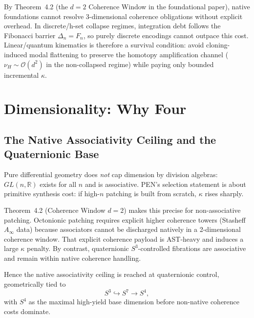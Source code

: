 \documentclass[12pt,a4paper]{article}
\theoremstyle{definition}
\newcommand{\R}{\mathbb{R}}
\begin{document}
By Theorem~4.2 (the $d=2$ Coherence Window in the foundational paper), native foundations cannot resolve 3-dimensional coherence obligations without explicit overhead. In discrete/h-set collapse regimes, integration debt follows the Fibonacci barrier $\Delta_n=F_n$, so purely discrete encodings cannot outpace this cost. Linear/quantum kinematics is therefore a survival condition: avoid cloning-induced modal flattening to preserve the homotopy amplification channel ($\nu_H\sim\mathcal{O}(d^2)$ in the non-collapsed regime) while paying only bounded incremental $\kappa$.

\begin{center}
\end{center}

\section{Dimensionality: Why Four}

\subsection{The Native Associativity Ceiling and the Quaternionic Base}

Pure differential geometry does \emph{not} cap dimension by division algebras: $GL(n,\R)$ exists for all $n$ and is associative. PEN's selection statement is about primitive synthesis cost: if high-$n$ patching is built from scratch, $\kappa$ rises sharply.

Theorem~4.2 (Coherence Window $d=2$) makes this precise for non-associative patching. Octonionic patching requires explicit higher coherence towers (Stasheff $A_\infty$ data) because associators cannot be discharged natively in a 2-dimensional coherence window. That explicit coherence payload is AST-heavy and induces a large $\kappa$ penalty. By contrast, quaternionic $S^3$-controlled fibrations are associative and remain within native coherence handling.

Hence the native associativity ceiling is reached at quaternionic control, geometrically tied to
\begin{equation}
S^3 \hookrightarrow S^7 \to S^4,
\end{equation}
with $S^4$ as the maximal high-yield base dimension before non-native coherence costs dominate.
\end{document}
